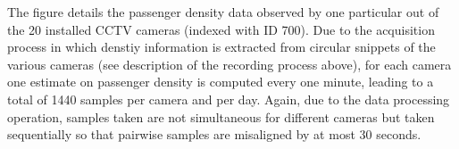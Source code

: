 The figure details the passenger density data observed by one particular out of the 20 installed CCTV cameras (indexed with ID 700).
Due to the acquisition process in which denstiy information is extracted from circular snippets 
of the various cameras (see description of the recording process above), for each camera one estimate on passenger density is computed every one minute, leading to a total of 1440 samples per camera and per day.
Again, due to the data processing operation, samples taken are not simultaneous for different cameras but taken sequentially so that pairwise samples are misaligned by at most 30 seconds.

